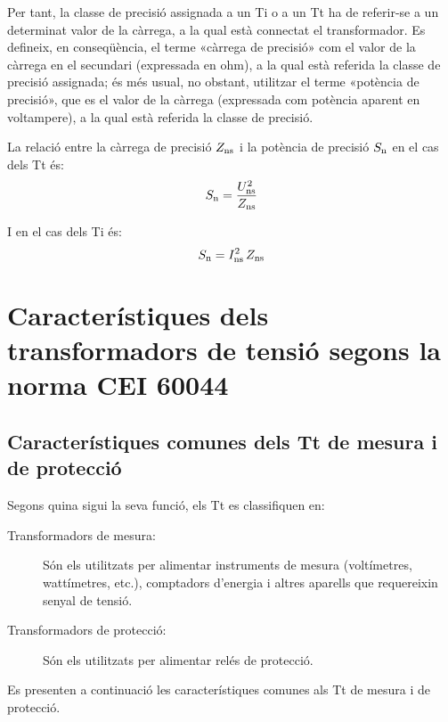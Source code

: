 Per tant, la classe de precisió assignada a un Ti o a un Tt ha de
referir-se a un determinat valor de la càrrega, a la qual està
connectat el transformador. Es defineix, en conseqüència, el terme
«càrrega de precisió» com el valor de la càrrega en el secundari
(expressada en ohm), a la qual està referida la classe de precisió
assignada; és més usual, no obstant,  utilitzar el terme «potència
de precisió», que es el valor de la càrrega (expressada com potència
aparent en voltampere),
 a la qual està referida la classe de precisió.

La relació entre la càrrega de precisió $Z_\mathrm{ns}$ i la potència de
precisió $S_\mathrm{n}$ en el cas dels Tt és:
\begin{equation}
    S_\mathrm{n} = \frac{U_\mathrm{ns}^2}{Z_\mathrm{ns}}
\end{equation}

I en el cas dels Ti és:
\begin{equation}\label{eq:sn_ti}
    S_\mathrm{n} = I_\mathrm{ns}^2 \,Z_\mathrm{ns}
\end{equation}


\section{Característiques dels transformadors de tensió segons la norma CEI 60044}

\subsection{Característiques comunes dels Tt de mesura i de protecció}

Segons quina sigui la seva funció, els Tt es classifiquen en:
\begin{description}
   \item [\hspace{5mm}Transformadors de mesura:] Són els utilitzats per alimentar
            instruments de mesura (voltímetres, wattímetres, etc.),
            comptadors d'energia i altres aparells que requereixin senyal de tensió.
   \item [\hspace{5mm}Transformadors de protecció:] Són els utilitzats per
   alimentar relés de protecció.
\end{description}

Es presenten a continuació les característiques comunes als Tt de
mesura i de protecció.

